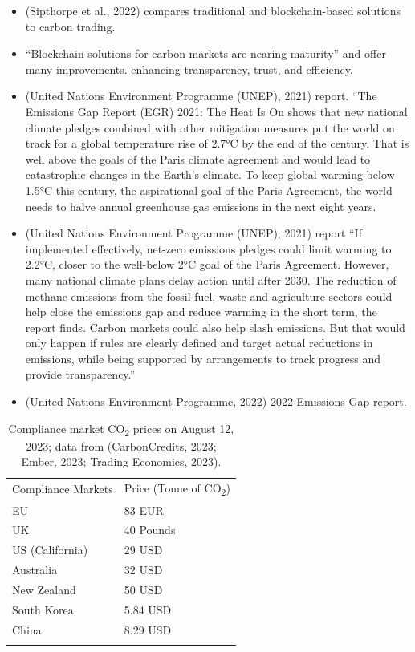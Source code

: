 \documentclass[
  letterpaper,
  DIV=11,
  numbers=noendperiod]{scrartcl}
\begin{document}
\begin{itemize}
\item
  (Sipthorpe et al., 2022) compares traditional and blockchain-based
  solutions to carbon trading.
\item
  ``Blockchain solutions for carbon markets are nearing maturity'' and
  offer many improvements. enhancing transparency, trust, and
  efficiency.
\item
  (United Nations Environment Programme (UNEP), 2021) report. ``The
  Emissions Gap Report (EGR) 2021: The Heat Is On shows that new
  national climate pledges combined with other mitigation measures put
  the world on track for a global temperature rise of 2.7°C by the end
  of the century. That is well above the goals of the Paris climate
  agreement and would lead to catastrophic changes in the Earth's
  climate. To keep global warming below 1.5°C this century, the
  aspirational goal of the Paris Agreement, the world needs to halve
  annual greenhouse gas emissions in the next eight years.
\item
  (United Nations Environment Programme (UNEP), 2021) report ``If
  implemented effectively, net-zero emissions pledges could limit
  warming to 2.2°C, closer to the well-below 2°C goal of the Paris
  Agreement. However, many national climate plans delay action until
  after 2030. The reduction of methane emissions from the fossil fuel,
  waste and agriculture sectors could help close the emissions gap and
  reduce warming in the short term, the report finds. Carbon markets
  could also help slash emissions. But that would only happen if rules
  are clearly defined and target actual reductions in emissions, while
  being supported by arrangements to track progress and provide
  transparency.''
\item
  (United Nations Environment Programme, 2022) 2022 Emissions Gap
  report.
\end{itemize}

\begin{longtable}[]{@{}ll@{}}
\caption{Compliance market CO\textsubscript{2} prices on August 12,
2023; data from (CarbonCredits, 2023; Ember, 2023; Trading Economics,
2023).}\tabularnewline
\toprule\noalign{}
\endfirsthead
\endhead
\bottomrule\noalign{}
\endlastfoot
Compliance Markets & Price (Tonne of CO\textsubscript{2}) \\
EU & 83 EUR \\
UK & 40 Pounds \\
US (California) & 29 USD \\
Australia & 32 USD \\
New Zealand & 50 USD \\
South Korea & 5.84 USD \\
China & 8.29 USD \\
& \\
\end{longtable}
\end{document}
